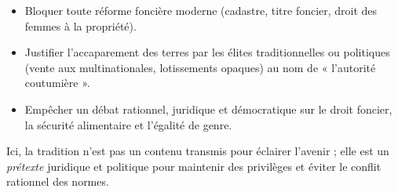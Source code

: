 \documentclass[11pt]{article}
\begin{document}
\begin{corrige}
\begin{enumerate}
\begin{itemize}
\item Bloquer toute réforme foncière moderne (cadastre, titre foncier, droit des femmes à la propriété).
\item Justifier l'accaparement des terres par les élites traditionnelles ou politiques (vente aux multinationales, lotissements opaques) au nom de « l'autorité coutumière ».
\item Empêcher un débat rationnel, juridique et démocratique sur le droit foncier, la sécurité alimentaire et l'égalité de genre.
\end{itemize}
Ici, la tradition n'est pas un contenu transmis pour éclairer l'avenir ; elle est un \emph{prétexte} juridique et politique pour maintenir des privilèges et éviter le conflit rationnel des normes.
\end{enumerate}
\end{corrige}
\end{document}
